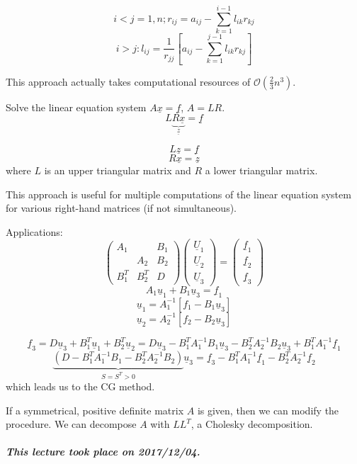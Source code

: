 \documentclass{article}
\newcommand{\dateref}[1]{\paragraph{\textit{This lecture took place on #1.}}}
\begin{document}
\[ i < j = 1,n; r_{ij} = a_{ij} - \sum_{k=1}^{i-1} l_{ik} r_{kj} \]
\[ i > j: l_{ij} = \frac{1}{r_{jj}} \left[ a_{ij} - \sum_{k=1}^{j-1} l_{ik} r_{kj} \right] \]

This approach actually takes computational resources of $\mathcal{O}(\frac23 n^3)$.

Solve the linear equation system $A \underline{x} = \underline{f}$, $A = LR$.
\[ L\underbrace{R\underline{x}}_{\underline{z}} = \underline{f} \]

\[ L \underline{z} = \underline{f} \]
\[ R \underline{x} = \underline{z} \]
where $L$ is an upper triangular matrix and $R$ a lower triangular matrix.

This approach is useful for multiple computations of the linear equation system for various right-hand matrices (if not simultaneous).

Applications:
\[
  \begin{pmatrix}
    A_1 & & B_1 \\
     & A_2 & B_2 \\
    B_1^T & B_2^T & D
  \end{pmatrix} \begin{pmatrix}
    \underline{U}_1 \\ \underline{U}_2 \\ \underline{U}_3
  \end{pmatrix} = \begin{pmatrix}
    \underline{f}_1 \\
    \underline{f}_2 \\
    \underline{f}_3
  \end{pmatrix}
\]
\[ A_1 \underline{u}_1 + B_1 \underline{u}_3 = \underline{f}_1 \]
\[ \underline{u}_1 = A_1^{-1} \left[ f_1 - B_1 \underline{u}_3 \right] \]
\[ \underline{u}_2 = A_2^{-1} \left[ f_2 - B_2 \underline{u}_3 \right] \]

\[ \underline{f}_3 = D \underline{u}_3 + B_1^T \underline{u}_1 + B_2^T \underline{u}_2 = D \underline{u}_3 - B_1^T A_1^{-1} B_1 \underline{u}_3 - B_2^T A_2^{-1} B_2 \underline{u}_3 + B_1^T A_1^{-1} \underline{f}_{1} \]
\[ \underbrace{\left(D - B_1^T A_1^{-1} B_1 - B_2^T A_2^{-1} B_2\right)}_{S = S^T > 0} \underline{u}_3 = \underline{f}_3 - B_1^T A_1^{-1} \underline{f}_1 - B_2^T A_2^{-1} \underline{f}_2 \]
which leads us to the CG method.

If a symmetrical, positive definite matrix $A$ is given, then we can modify the procedure.
We can decompose $A$ with $LL^T$, a Cholesky decomposition.

\dateref{2017/12/04}
\end{document}

